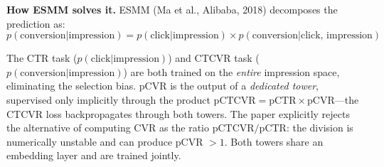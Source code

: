 \textbf{How ESMM solves it.} ESMM (Ma et al., Alibaba, 2018) decomposes the prediction as:
\begin{equation}
p(\text{conversion} | \text{impression}) = p(\text{click} | \text{impression}) \times p(\text{conversion} | \text{click, impression})
\end{equation}

The CTR task ($p(\text{click}|\text{impression})$) and CTCVR task ($p(\text{conversion}|\text{impression})$) are both trained on the \textit{entire} impression space, eliminating the selection bias. pCVR is the output of a \textit{dedicated tower}, supervised only implicitly through the product $\text{pCTCVR} = \text{pCTR} \times \text{pCVR}$---the CTCVR loss backpropagates through both towers. The paper explicitly rejects the alternative of computing CVR as the ratio $\text{pCTCVR}/\text{pCTR}$: the division is numerically unstable and can produce pCVR $> 1$. Both towers share an embedding layer and are trained jointly.

